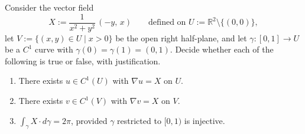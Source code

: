 \begin{exercise}
\label{ex:angle_field_true_false}
Consider the vector field
\[X := \frac{1}{x^2+y^2}\,(-y,\, x) \qquad \text{defined on } U := \mathbb{R}^2 \setminus \{(0,0)\},\]
let $V := \{(x,y) \in U \mid x > 0\}$ be the open right half-plane, and let $\gamma : [0,1] \to U$ be
a $C^1$ curve with $\gamma(0) = \gamma(1) = (0,1)$. Decide whether each of the following is true or
false, with justification.
\begin{enumerate}[label=\textbf{(\alph*)}]
  \item There exists $u \in C^1(U)$ with $\nabla u = X$ on $U$.
  \item There exists $v \in C^1(V)$ with $\nabla v = X$ on $V$.
  \item $\int_\gamma X \cdot d\gamma = 2\pi$, provided $\gamma$ restricted to $[0,1)$ is injective.
\end{enumerate}
\end{exercise}

